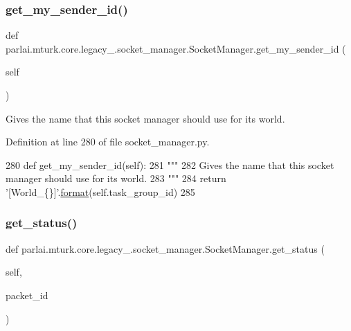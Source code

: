\subsubsection{\texorpdfstring{get\+\_\+my\+\_\+sender\+\_\+id()}{get\_my\_sender\_id()}}
{\footnotesize\ttfamily def parlai.\+mturk.\+core.\+legacy\+\_.\+socket\+\_\+manager.\+Socket\+Manager.\+get\+\_\+my\+\_\+sender\+\_\+id (\begin{DoxyParamCaption}\item[{}]{self }\end{DoxyParamCaption})}

\begin{DoxyVerb}Gives the name that this socket manager should use for its world.
\end{DoxyVerb}
 

Definition at line 280 of file socket\+\_\+manager.\+py.


\begin{DoxyCode}
280     \textcolor{keyword}{def }get\_my\_sender\_id(self):
281         \textcolor{stringliteral}{"""}
282 \textcolor{stringliteral}{        Gives the name that this socket manager should use for its world.}
283 \textcolor{stringliteral}{        """}
284         \textcolor{keywordflow}{return} \textcolor{stringliteral}{'[World\_\{\}]'}.\hyperlink{namespaceparlai_1_1chat__service_1_1services_1_1messenger_1_1shared__utils_a32e2e2022b824fbaf80c747160b52a76}{format}(self.task\_group\_id)
285 
\end{DoxyCode}
\mbox{\label{classparlai_1_1mturk_1_1core_1_1legacy__2018_1_1socket__manager_1_1SocketManager_a260df8c8135ae0759b5578283db9fd89}} 
\subsubsection{\texorpdfstring{get\+\_\+status()}{get\_status()}}
{\footnotesize\ttfamily def parlai.\+mturk.\+core.\+legacy\+\_.\+socket\+\_\+manager.\+Socket\+Manager.\+get\+\_\+status (\begin{DoxyParamCaption}\item[{}]{self,  }\item[{}]{packet\+\_\+id }\end{DoxyParamCaption})}


